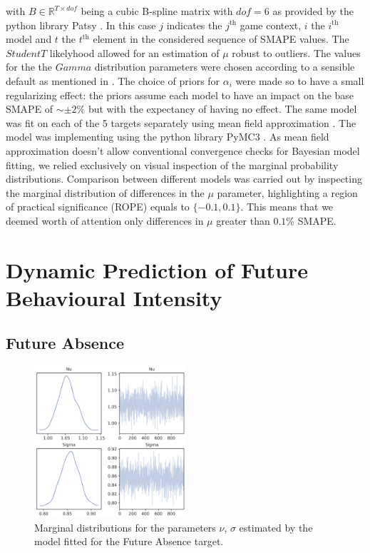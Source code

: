 with $B \in \mathbb{R}^{T \times dof}$ being a cubic B-spline matrix with $dof=6$ as provided by the python library Patsy \cite{patsy}. In this case $j$ indicates the $j^{\text{th}}$ game context, $i$ the $i^{\text{th}}$ model and $t$ the $t^{\text{th}}$ element in the considered sequence of SMAPE values. The $StudentT$ likelyhood allowed for an estimation of $\mu$ robust to outliers. The values for the the $Gamma$ distribution parameters were chosen according to a sensible default as mentioned in \cite{vehtarinu}. The choice of priors for $\alpha_{i}$ were made so to have a small regularizing effect: the priors assume each model to have an impact on the base SMAPE of $\sim \pm 2\% $ but with the expectancy of having no effect. The same model was fit on each of the 5 targets separately using mean field approximation \cite{kucukelbir2017automatic}. The model was implementing using the python library PyMC3 \cite{salvatier2016probabilistic}. As mean field approximation doesn't allow conventional convergence checks for Bayesian model fitting, we relied exclusively on visual inspection of the marginal probability distributions. Comparison between different models was carried out by inspecting the marginal distribution of differences in the $\mu$ parameter, highlighting a region of practical significance (ROPE) equals to $\{-0.1, 0.1\}$. This means that we deemed worth of attention only differences in $\mu$ greater than $0.1\%$ SMAPE.

\section{Dynamic Prediction of Future Behavioural Intensity}
\label{dynamic_prediction_ancillary_perf}

\subsection{Future Absence}
\label{future_act_bayes_2}

\begin{figure}[H]
\centering
\includegraphics[width=0.5\textwidth]{images/appendix_C/Future Absence_marginals_2.png}
\caption[\textbf{Future absence marginal distributions}]{Marginal distributions for the parameters $\nu$, $\sigma$ estimated by the model fitted for the Future Absence target.}
\label{marginals_abs_2}
\end{figure}


